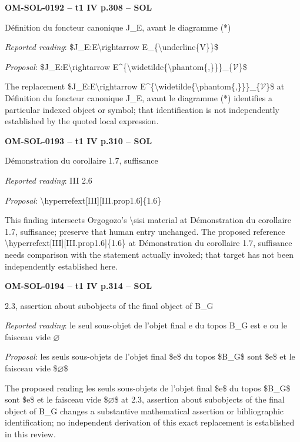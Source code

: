 \par\noindent\textbf{OM-SOL-0192 -- t1 IV p.308 -- SOL}\par
Définition du foncteur canonique J\_E, avant le diagramme (*)\par
\emph{Reported reading}: \$J\_E:E\textbackslash{}rightarrow E\_\{\textbackslash{}underline\{V\}\}\$\par
\emph{Proposal}: \$J\_E:E\textbackslash{}rightarrow E\textasciicircum{}\{\textbackslash{}widetilde\{\textbackslash{}phantom\{,\}\}\}\_\{\ensuremath{𝒱}\}\$\par
The replacement \$J\_E:E\textbackslash{}rightarrow E\textasciicircum{}\{\textbackslash{}widetilde\{\textbackslash{}phantom\{,\}\}\}\_\{\ensuremath{𝒱}\}\$ at Définition du foncteur canonique J\_E, avant le diagramme (*) identifies a particular indexed object or symbol; that identification is not independently established by the quoted local expression.\par
\par\noindent\textbf{OM-SOL-0193 -- t1 IV p.310 -- SOL}\par
Démonstration du corollaire 1.7, suffisance\par
\emph{Reported reading}: III 2.6\par
\emph{Proposal}: \textbackslash{}hyperrefext[III][III.prop1.6]\{1.6\}\par
This finding intersects Orgogozo's \textbackslash{}sisi material at Démonstration du corollaire 1.7, suffisance; preserve that human entry unchanged. The proposed reference \textbackslash{}hyperrefext[III][III.prop1.6]\{1.6\} at Démonstration du corollaire 1.7, suffisance needs comparison with the statement actually invoked; that target has not been independently established here.\par
\par\noindent\textbf{OM-SOL-0194 -- t1 IV p.314 -- SOL}\par
2.3, assertion about subobjects of the final object of B\_G\par
\emph{Reported reading}: le seul sous-objet de l'objet final e du topos B\_G est e ou le faisceau vide \ensuremath{\varnothing}\par
\emph{Proposal}: les seuls sous-objets de l'objet final \$e\$ du topos \$B\_G\$ sont \$e\$ et le faisceau vide \$\ensuremath{\varnothing}\$\par
The proposed reading les seuls sous-objets de l'objet final \$e\$ du topos \$B\_G\$ sont \$e\$ et le faisceau vide \$\ensuremath{\varnothing}\$ at 2.3, assertion about subobjects of the final object of B\_G changes a substantive mathematical assertion or bibliographic identification; no independent derivation of this exact replacement is established in this review.\par
